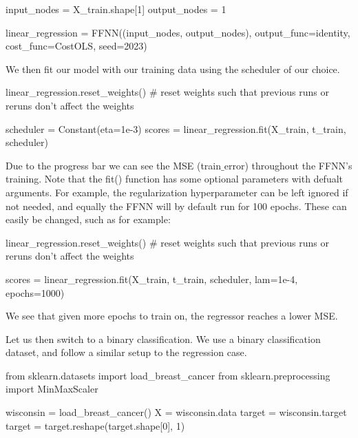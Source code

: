 \documentclass[%
oneside,                 %
final,                   %
10pt]{article}
\begin{document}
\bpycod
input_nodes = X_train.shape[1]
output_nodes = 1

linear_regression = FFNN((input_nodes, output_nodes), output_func=identity, cost_func=CostOLS, seed=2023)


\epycod


We then fit our model with our training data using the scheduler of our choice.








\bpycod
linear_regression.reset_weights() # reset weights such that previous runs or reruns don't affect the weights

scheduler = Constant(eta=1e-3)
scores = linear_regression.fit(X_train, t_train, scheduler)



\epycod


Due to the progress bar we can see the MSE (train$\_$error) throughout
the FFNN's training. Note that the fit() function has some optional
parameters with defualt arguments. For example, the regularization
hyperparameter can be left ignored if not needed, and equally the FFNN
will by default run for 100 epochs. These can easily be changed, such
as for example:






\bpycod
linear_regression.reset_weights() # reset weights such that previous runs or reruns don't affect the weights

scores = linear_regression.fit(X_train, t_train, scheduler, lam=1e-4, epochs=1000)


\epycod


We see that given more epochs to train on, the regressor reaches a lower MSE.

Let us then switch to a binary classification. We use a binary
classification dataset, and follow a similar setup to the regression
case.


















\bpycod
from sklearn.datasets import load_breast_cancer
from sklearn.preprocessing import MinMaxScaler

wisconsin = load_breast_cancer()
X = wisconsin.data
target = wisconsin.target
target = target.reshape(target.shape[0], 1)
\end{document}
